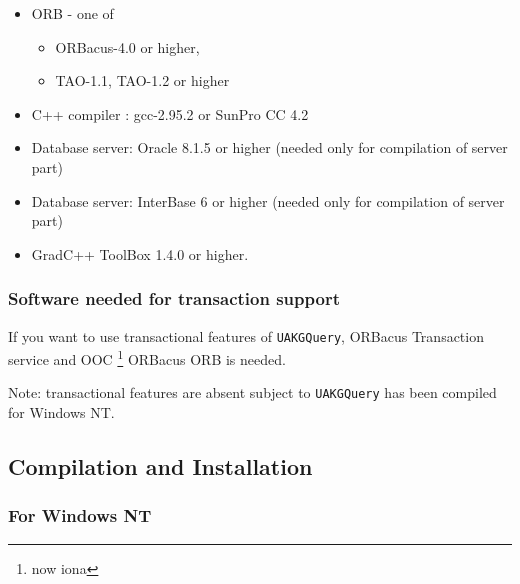 \documentclass[10pt]{article}
\begin{document}
\begin{itemize}
 \item ORB - one of
  \begin{itemize}
     \item ORBacus-4.0 or higher, 
     \item TAO-1.1, TAO-1.2 or higher
   \end{itemize}
 \item C++ compiler : gcc-2.95.2 or SunPro CC 4.2 
 \item Database server: Oracle 8.1.5 or higher (needed only for compilation of server part)
 \item Database server: InterBase 6 or higher (needed only for compilation of server part)
 \item GradC++ ToolBox 1.4.0 or higher.
\end{itemize}

\subsubsection { Software needed for transaction support }

 If you want to use transactional features of \verb|UAKGQuery|, ORBacus
 Transaction service and OOC \footnote{now iona} ORBacus ORB is needed.

 Note: transactional features are absent subject to \verb|UAKGQuery|
 has been compiled for Windows NT.

\subsection{ Compilation and Installation }

\subsubsection{ For Windows NT }
\end{document}
